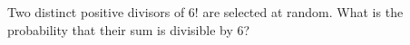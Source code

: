 Two distinct positive divisors of $6!$ are selected at random. What is the probability that their sum is divisible by $6$?
